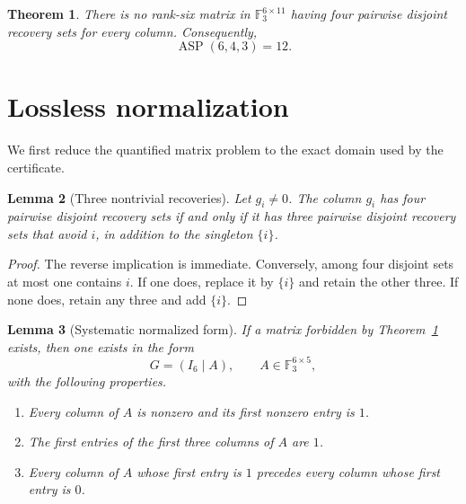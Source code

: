 \documentclass[11pt]{article}
\newtheorem{theorem}{Theorem}
\newtheorem{lemma}[theorem]{Lemma}
\newcommand{\F}{\mathbb F}
\newcommand{\ASP}{\operatorname{ASP}}
\begin{document}
\begin{theorem}\label{thm:main}
There is no rank-six matrix in $\F_3^{6\times11}$ having four pairwise
disjoint recovery sets for every column.  Consequently,
\[
  \ASP(6,4,3)=12.
\]
\end{theorem}

\section{Lossless normalization}

We first reduce the quantified matrix problem to the exact domain used
by the certificate.

\begin{lemma}[Three nontrivial recoveries]\label{lem:three}
Let $g_i\neq0$.  The column $g_i$ has four pairwise disjoint recovery
sets if and only if it has three pairwise disjoint recovery sets that
avoid $i$, in addition to the singleton $\{i\}$.
\end{lemma}

\begin{proof}
The reverse implication is immediate.  Conversely, among four disjoint
sets at most one contains $i$.  If one does, replace it by $\{i\}$ and
retain the other three.  If none does, retain any three and add
$\{i\}$.
\end{proof}

\begin{lemma}[Systematic normalized form]\label{lem:normalization}
If a matrix forbidden by Theorem~\ref{thm:main} exists, then one exists
in the form
\[
  G=(I_6\mid A),\qquad A\in\F_3^{6\times5},
\]
with the following properties.
\begin{enumerate}
  \item[(i)] Every column of $A$ is nonzero and its first nonzero entry is
        $1$.
  \item[(ii)] The first entries of the first three columns of $A$ are $1$.
  \item[(iii)] Every column of $A$ whose first entry is $1$ precedes every
        column whose first entry is $0$.
\end{enumerate}
\end{lemma}
\end{document}
